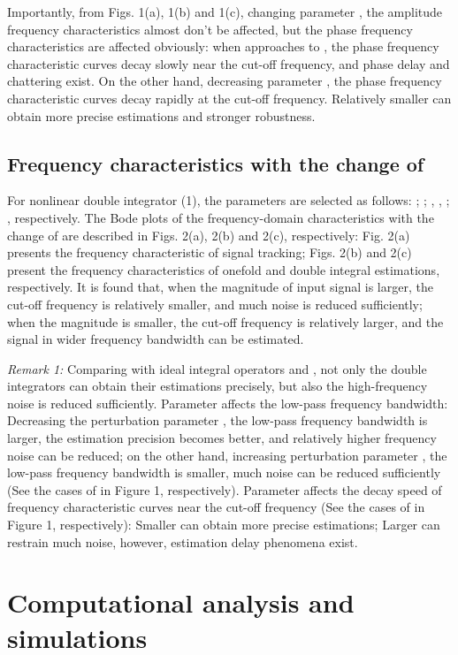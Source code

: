 \documentclass[10pt,journal]{IEEEtran}
\begin{document}
Importantly, from Figs. 1(a), 1(b) and 1(c), changing parameter , the amplitude frequency characteristics almost don't be
affected, but the phase frequency characteristics are affected obviously:
when  approaches to , the phase frequency characteristic
curves decay slowly near the cut-off frequency, and phase delay and
chattering exist. On the other hand, decreasing parameter , the phase frequency characteristic curves decay rapidly at the
cut-off frequency. Relatively smaller  can obtain more
precise estimations and stronger robustness.

\subsection{Frequency characteristics with the change of }

For nonlinear double integrator (1), the parameters are selected as follows:
; ; , , ; , respectively. The Bode plots of the frequency-domain
characteristics with the change of  are described in Figs. 2(a), 2(b)
and 2(c), respectively: Fig. 2(a) presents the frequency characteristic of
signal tracking; Figs. 2(b) and 2(c) present the frequency characteristics
of onefold and double integral estimations, respectively. It is found that,
when the magnitude of input signal  is larger, the cut-off frequency
is relatively smaller, and much noise is reduced sufficiently; when the
magnitude  is smaller, the cut-off frequency is relatively larger,
and the signal in wider frequency bandwidth can be estimated.

\bigskip

\emph{Remark 1:} Comparing with ideal integral operators  and , not only the double integrators can obtain their estimations precisely,
but also the high-frequency noise is reduced sufficiently. Parameter  affects the low-pass frequency bandwidth: Decreasing the
perturbation parameter , the low-pass frequency bandwidth is
larger, the estimation precision becomes better, and relatively higher
frequency noise can be reduced; on the other hand, increasing perturbation
parameter , the low-pass frequency bandwidth is smaller, much
noise can be reduced sufficiently (See the cases of 
in Figure 1, respectively). Parameter  affects the
decay speed of frequency characteristic curves near the cut-off frequency
(See the cases of  in Figure 1,
respectively): Smaller  can obtain more precise
estimations; Larger  can restrain much noise, however,
estimation delay phenomena exist.

\section{Computational analysis and simulations}
\end{document}

